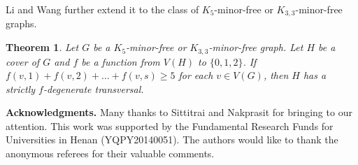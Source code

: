 \documentclass{article}
\newtheorem{theorem}{Theorem}[section]
\theoremstyle{definition}
\begin{document}
Li and Wang \cite{Li} further extend it to the class of $K_{5}$-minor-free or $K_{3, 3}$-minor-free graphs. 

\begin{theorem}
Let $G$ be a $K_{5}$-minor-free or $K_{3, 3}$-minor-free graph. Let $H$ be a cover of $G$ and $f$ be a function from $V(H)$ to $\{0, 1, 2\}$. If $f(v, 1) + f(v, 2) + \dots + f(v, s) \geq 5$ for each $v \in V(G)$, then $H$ has a strictly $f$-degenerate transversal. 
\end{theorem}


\vskip 0mm \vspace{0.3cm} \noindent\textbf{Acknowledgments.} Many thanks to Sittitrai and Nakprasit for bringing \cite{MR1743629} to our attention. This work was supported by the Fundamental Research Funds for Universities in Henan (YQPY20140051). The authors would like to thank the anonymous referees for their valuable comments. 
\end{document}

